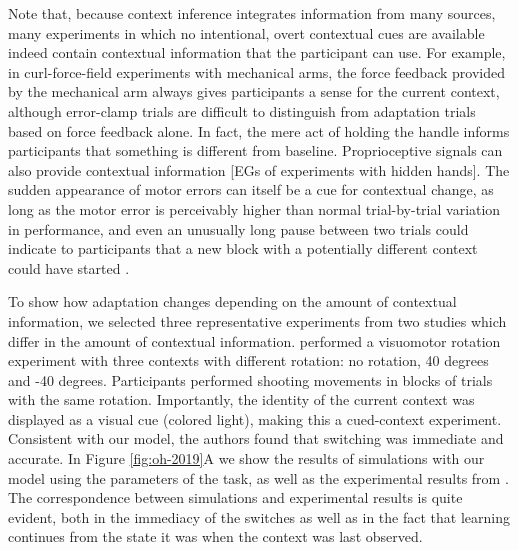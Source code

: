 \documentclass[a4paper,doc,floatsintext,natbib]{apa6}
\def \fref #1{Figure \ref{#1}}     %
\begin{document}
Note that, because context inference integrates information from many sources, many experiments in which no intentional, overt contextual cues are available indeed contain contextual information that the participant can use. For example, in curl-force-field experiments with mechanical arms, the force feedback provided by the mechanical arm always gives participants a sense for the current context, although error-clamp trials are difficult to distinguish from adaptation trials based on force feedback alone. In fact, the mere act of holding the handle informs participants that something is different from baseline. Proprioceptive signals can also provide contextual information [EGs of experiments with hidden hands]. The sudden appearance of motor errors can itself be a cue for contextual change, as long as the motor error is perceivably higher than normal trial-by-trial variation in performance, and even an unusually long pause between two trials could indicate to participants that a new block with a potentially different context could have started \cite[e.g.][]{Ethier_Spontaneous_2008}.

To show how adaptation changes depending on the amount of contextual information, we selected three representative experiments from two studies which differ in the amount of contextual information. \cite{Kim_Neural_2015} performed a visuomotor rotation experiment with three contexts with different rotation: no rotation, 40 degrees and -40 degrees. Participants performed shooting movements in blocks of trials with the same rotation. Importantly, the identity of the current context was displayed as a visual cue (colored light), making this a cued-context experiment. Consistent with our model, the authors found that switching was immediate and accurate. In \fref{fig:oh-2019}A we show the results of simulations with our model using the parameters of the task, as well as the experimental results from \cite{Kim_Neural_2015}. The correspondence between simulations and experimental results is quite evident, both in the immediacy of the switches as well as in the fact that learning continues from the state it was when the context was last observed.
\end{document}
